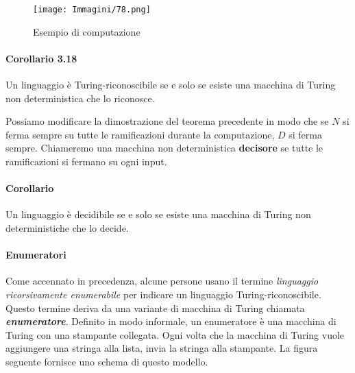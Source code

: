 \documentclass{article}
\begin{document}
\begin{figure}[H]
    \centering
    \texttt{[image: Immagini/78.png]}
    \caption{Esempio di computazione}
    \label{fig:nuova_immagine}
\end{figure}

\paragraph{Corollario 3.18}
\label{cor:da MdT deterministica a non deterministica}
\text{ }

\begin{tcolorbox}[colback=blue!10!white, colframe=blue!50!black, title=Corollario 3.18]
    Un linguaggio è Turing-riconoscibile se e solo se esiste una macchina di Turing non deterministica che lo riconosce.
\end{tcolorbox}

Possiamo modificare la dimostrazione del teorema precedente in modo che se $N$ si ferma sempre su tutte le ramificazioni durante la computazione, $D$ si ferma sempre.
Chiameremo una macchina non deterministica \textbf{decisore} se tutte le ramificazioni si fermano su ogni input.

\paragraph{Corollario}
\label{cor:da MdT deterministica a non deterministica}
\text{ }

\begin{tcolorbox}[colback=blue!10!white, colframe=blue!50!black, title=Corollario]
    Un linguaggio è decidibile se e solo se esiste una macchina di Turing non deterministiche che lo decide.
\end{tcolorbox}

\paragraph{Enumeratori}
\label{def:enumerator}
\text{ }

Come accennato in precedenza, alcune persone usano il termine \textit{linguaggio ricorsivamente enumerabile} per indicare un linguaggio Turing-riconoscibile.
Questo termine deriva da una variante di macchina di Turing chiamata \textbf{\textit{enumeratore}}.
Definito in modo informale, un enumeratore è una macchina di Turing con una stampante collegata.
Ogni volta che la macchina di Turing vuole aggiungere una stringa alla lista, invia la stringa alla stampante.
La figura seguente fornisce uno schema di questo modello.
\end{document}
